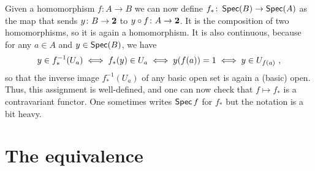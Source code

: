 \documentclass[a4paper]{article}
\begin{document}
Given a homomorphism $f \colon A \to B$ we can now define $f_* \colon \operatorname*{\mathsf{Spec}}(B) \to \operatorname*{\mathsf{Spec}}(A)$
as the map that sends $y \colon B \to \mathbf{2}$ to $y \circ f \colon A \to
\mathbf{2}$. It is the composition of two homomorphisms, so it is again a
homomorphism. It is also continuous, because for any $a \in A$ and $y \in
\operatorname*{\mathsf{Spec}}(B)$, we have
\[ y \in f_*^{-1}(U_a) \iff f_*(y) \in U_a \iff y(f(a)) = 1 \iff y \in
U_{f(a)}\ , \]
so that the inverse image $f_*^{-1}(U_a)$ of any basic open set is again a
(basic) open.
Thus, this assignment is well-defined, and one can now check that $f \mapsto
f_*$ is a contravariant functor. One sometimes writes $\operatorname*{\mathsf{Spec}} f$ for $f_*$ but
the notation is a bit heavy.

\section{The equivalence}

\end{document}
